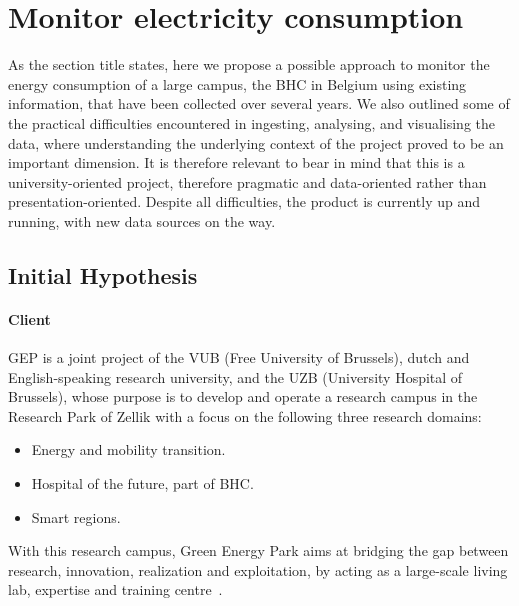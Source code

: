 \section{Monitor electricity consumption}
As the section title states, here we propose a possible approach to monitor the energy consumption of a large campus, the \ac{BHC} in Belgium using existing information, that have been collected over several years.
We also outlined some of the practical difficulties encountered in ingesting, analysing, and visualising the data, 
where understanding the underlying context of the project proved to be an important dimension. 
It is therefore relevant to bear in mind that this is a university-oriented project, therefore pragmatic and data-oriented rather than presentation-oriented.
Despite all difficulties, the product is currently up and running, with new data sources on the way.

\subsection{Initial Hypothesis}\label{sub:vub_initial_hp}
\paragraph{Client} 
\ac{GEP} is a joint project of the \ac{VUB} (Free University of Brussels), dutch and English-speaking research university, and the \ac{UZB} (University Hospital of Brussels), 
whose purpose is to develop and operate a research campus in the Research Park of Zellik with a focus on the following three research domains:
\begin{itemize}
    \item Energy and mobility transition.
    \item Hospital of the future, part of \ac{BHC}.
    \item Smart regions.
\end{itemize}
With this research campus, Green Energy Park aims at bridging the gap between research, innovation, realization and exploitation, by acting as a large-scale living lab, expertise and training centre~\cite{Misc:vub_2020_green}.
